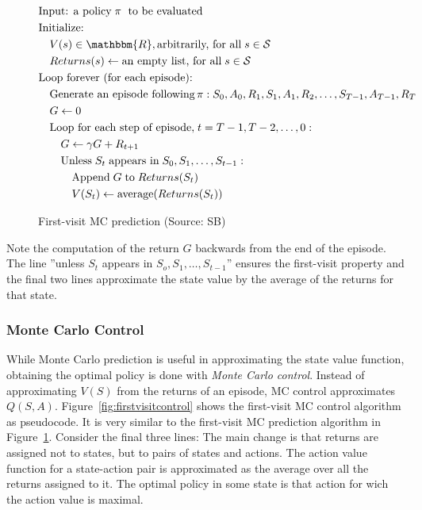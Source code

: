\begin{figure}
\begin{pseudocodebox}
\small
\vspace{-\baselineskip}
\begin{align*}
& \text{Input: a policy}\;\pi\;\text{ to be evaluated} \\
& \text{Initialize:} \\
& \quad V(s) \in \mathbbm{R}, \text{arbitrarily, for all}\;s \in \mathcal{S} \\
& \quad Returns(s) \leftarrow \text{an empty list, for all}\; s \in \mathcal{S} \\
& \text{Loop forever (for each episode):}\\
& \quad \text{Generate an episode following}\, \pi: S_0, A_0, R_1, S_1, A_1, R_2, \ldots, S_{T-1}, A_{T-1}, R_{T} \\
& \quad G \leftarrow 0 \\
& \quad \text{Loop for each step of episode,}\; t = T-1, T-2, \ldots, 0: \\
& \quad \quad G \leftarrow \gamma G + R_{t+1} \\
& \quad \quad \text{Unless}\; S_t\; \text{appears in}\; S_0, S_1, \ldots, S_{t-1}: \\
& \quad \quad \quad \text{Append}\; G\; \text{to}\; Returns(S_t) \\
& \quad \quad \quad V(S_t) \leftarrow \operatorname{average}(Returns(S_t))
\end{align*}
\end{pseudocodebox}
\caption[First-visit MC prediction]{First-visit MC prediction (Source: SB)}
\label{fig:firstvisitmc}
\end{figure}

Note the computation of the return $G$ backwards from the end of the episode. The line ''unless $S_t$ appears in $S_o, S_1, \ldots, S_{t-1}$'' ensures the first-visit property and the final two lines approximate the state value by the average of the returns for that state.

\subsubsection*{Monte Carlo Control}

While Monte Carlo prediction is useful in approximating the state value function, obtaining the optimal policy is done with \emph{Monte Carlo control}. Instead of approximating $V(S)$ from the returns of an episode, MC control approximates $Q(S, A)$. Figure~\ref{fig:firstvisitcontrol} shows the first-visit MC control algorithm as pseudocode. It is very similar to the first-visit MC prediction algorithm in Figure~\ref{fig:firstvisitmc}. Consider the final three lines: The main change is that returns are assigned not to states, but to pairs of states and actions. The action value function for a state-action pair is approximated as the average over all the returns assigned to it. The optimal policy in some state is that action for wich the action value is maximal. 

